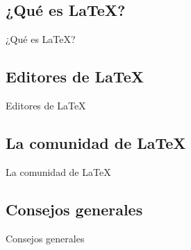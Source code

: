 \documentclass[../slides.tex]{subfiles}
\begin{document}
    \tableofcontents[sections=\value{section}]

    \subsection{¿Qué es \LaTeX{}?}
        
    \begin{frame}{¿Qué es \LaTeX{}?}

        
    \end{frame}

    \subsection{Editores de \LaTeX{}}

    \begin{frame}{Editores de \LaTeX{}}

        
    \end{frame}

    \subsection{La comunidad de \LaTeX{}}

    \begin{frame}{La comunidad de \LaTeX{}}

        
    \end{frame}

    \subsection{Consejos generales}

    \begin{frame}{Consejos generales}

        
    \end{frame}
\end{document}
